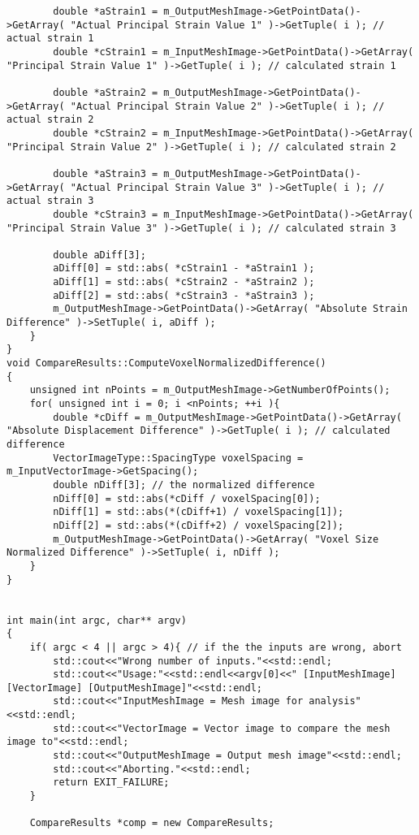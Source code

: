\begin{lstlisting}
		double *aStrain1 = m_OutputMeshImage->GetPointData()->GetArray( "Actual Principal Strain Value 1" )->GetTuple( i ); // actual strain 1
		double *cStrain1 = m_InputMeshImage->GetPointData()->GetArray( "Principal Strain Value 1" )->GetTuple( i ); // calculated strain 1
		
		double *aStrain2 = m_OutputMeshImage->GetPointData()->GetArray( "Actual Principal Strain Value 2" )->GetTuple( i ); // actual strain 2
		double *cStrain2 = m_InputMeshImage->GetPointData()->GetArray( "Principal Strain Value 2" )->GetTuple( i ); // calculated strain 2
		
		double *aStrain3 = m_OutputMeshImage->GetPointData()->GetArray( "Actual Principal Strain Value 3" )->GetTuple( i ); // actual strain 3
		double *cStrain3 = m_InputMeshImage->GetPointData()->GetArray( "Principal Strain Value 3" )->GetTuple( i ); // calculated strain 3
		
		double aDiff[3]; 
		aDiff[0] = std::abs( *cStrain1 - *aStrain1 );
		aDiff[1] = std::abs( *cStrain2 - *aStrain2 );
		aDiff[2] = std::abs( *cStrain3 - *aStrain3 );
		m_OutputMeshImage->GetPointData()->GetArray( "Absolute Strain Difference" )->SetTuple( i, aDiff );
	}
}
void CompareResults::ComputeVoxelNormalizedDifference()
{
	unsigned int nPoints = m_OutputMeshImage->GetNumberOfPoints();
	for( unsigned int i = 0; i <nPoints; ++i ){
		double *cDiff = m_OutputMeshImage->GetPointData()->GetArray( "Absolute Displacement Difference" )->GetTuple( i ); // calculated difference
		VectorImageType::SpacingType voxelSpacing = m_InputVectorImage->GetSpacing();
		double nDiff[3]; // the normalized difference 
		nDiff[0] = std::abs(*cDiff / voxelSpacing[0]);
		nDiff[1] = std::abs(*(cDiff+1) / voxelSpacing[1]);
		nDiff[2] = std::abs(*(cDiff+2) / voxelSpacing[2]);
		m_OutputMeshImage->GetPointData()->GetArray( "Voxel Size Normalized Difference" )->SetTuple( i, nDiff );
	}
}


int main(int argc, char** argv)
{
	if( argc < 4 || argc > 4){ // if the the inputs are wrong, abort
		std::cout<<"Wrong number of inputs."<<std::endl;
		std::cout<<"Usage:"<<std::endl<<argv[0]<<" [InputMeshImage] [VectorImage] [OutputMeshImage]"<<std::endl;
		std::cout<<"InputMeshImage = Mesh image for analysis"<<std::endl;
		std::cout<<"VectorImage = Vector image to compare the mesh image to"<<std::endl;
		std::cout<<"OutputMeshImage = Output mesh image"<<std::endl;
		std::cout<<"Aborting."<<std::endl;
		return EXIT_FAILURE;
	}

	CompareResults *comp = new CompareResults;
	

\end{lstlisting}
